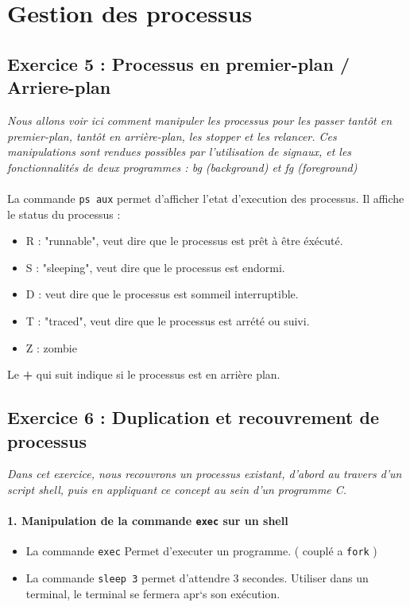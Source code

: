 \section{Gestion des processus}

\subsection{Exercice 5 : Processus en premier-plan / Arriere-plan}
\textit{Nous allons voir ici comment manipuler les processus pour les passer tantôt en premier-plan, tantôt en arrière-plan, les stopper et les relancer. Ces manipulations sont rendues possibles par l’utilisation de signaux, et les fonctionnalités de deux programmes : bg (background) et fg (foreground)}
\\\\
La commande \texttt{ps aux} permet d'afficher l'etat d'execution des processus.
Il affiche le status du processus :
\begin{itemize}
  \item R : "runnable", veut dire que le processus est prêt à être éxécuté.
  \item S : "sleeping", veut dire que le processus est endormi.
  \item D : veut dire que le processus est sommeil interruptible.
  \item T : "traced", veut dire que le processus est arrété ou suivi.
  \item Z : zombie
\end{itemize}
Le \textbf{+} qui suit indique si le processus est en arrière plan.

\subsection{Exercice 6 : Duplication et recouvrement de processus}
\textit{Dans cet exercice, nous recouvrons un processus existant, d’abord au travers d’un script shell, puis en appliquant ce concept au sein d’un programme C.}
\paragraph{1. Manipulation de la commande \texttt{exec} sur un shell}
\begin{itemize}
  \item La commande \texttt{exec} Permet d'executer un programme. ( couplé a \texttt{fork} )
  \item La commande \texttt{sleep 3} permet d'attendre 3 secondes.
  Utiliser dans un terminal, le terminal se fermera apr`s son exécution.
\end{itemize}

